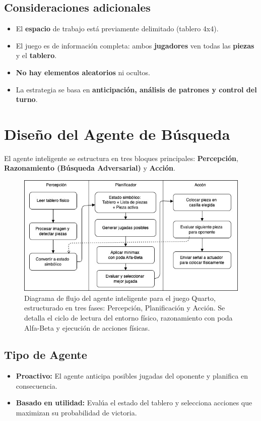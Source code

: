 \documentclass[conference]{IEEEtran}
\begin{document}
\subsection{Consideraciones adicionales}
\begin{itemize}

		\item El \textbf{espacio} de trabajo está previamente delimitado (tablero 4x4).
		\item El juego es de información completa: ambos \textbf{jugadores} ven todas las \textbf{piezas} y el \textbf{tablero}.
		\item \textbf{No hay elementos aleatorios} ni ocultos.
		\item La estrategia se basa en \textbf{anticipación, análisis de patrones y control del turno}.

\end{itemize}


\section{Diseño del Agente de Búsqueda}

El agente inteligente se estructura en tres bloques principales: \textbf{Percepción}, \textbf{Razonamiento (Búsqueda Adversarial)} y \textbf{Acción}.


\begin{figure}[h!]
	\centering
	\includegraphics[width=0.95\linewidth]{img/diagrama-busqueda.png}
	\caption{Diagrama de flujo del agente inteligente para el juego Quarto, estructurado en tres fases: Percepción, Planificación y Acción. Se detalla el ciclo de lectura del entorno físico, razonamiento con poda Alfa-Beta y ejecución de acciones físicas.}
	\label{fig:diagrama_busqueda}
\end{figure}

\subsection{Tipo de Agente}
\begin{itemize}
	\item \textbf{Proactivo:} El agente anticipa posibles jugadas del oponente y planifica en consecuencia.
	\item \textbf{Basado en utilidad:} Evalúa el estado del tablero y selecciona acciones que maximizan su probabilidad de victoria.
\end{itemize}
\end{document}
